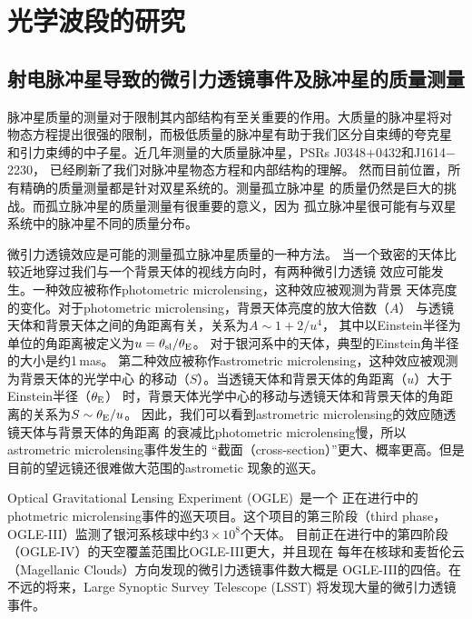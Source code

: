 
\chapter{光学波段的研究}

\section{射电脉冲星导致的微引力透镜事件及脉冲星的质量测量}

脉冲星质量的测量对于限制其内部结构有至关重要的作用。大质量的脉冲星将对
物态方程提出很强的限制，而极低质量的脉冲星有助于我们区分自束缚的夸克星
和引力束缚的中子星。近几年测量的大质量脉冲星，PSRs J0348$+$0432和J1614$-$2230，
已经刷新了我们对脉冲星物态方程和内部结构的理解\supercite{Anton,Demorest,Ozel2010,Lai2011}。
%
然而目前位置，所有精确的质量测量都是针对双星系统的。测量孤立脉冲星
的质量仍然是巨大的挑战。而孤立脉冲星的质量测量有很重要的意义，因为
孤立脉冲星很可能有与双星系统中的脉冲星不同的质量分布。

微引力透镜效应是可能的测量孤立脉冲星质量的一种方法\supercite{Dai,Schwarz02,Horvath96}。
当一个致密的天体比较近地穿过我们与一个背景天体的视线方向时，有两种微引力透镜
效应可能发生。一种效应被称作photometric microlensing，这种效应被观测为背景
天体亮度的变化。对于photometric microlensing，背景天体亮度的放大倍数（$A$）
与透镜天体和背景天体之间的角距离有关，关系为$A\sim 1+2/u^{4}$\supercite{mao}，
其中以Einstein半径为单位的角距离被定义为$u=\theta_{\rm{sl}}/\theta_{\rm{E}}$。
对于银河系中的天体，典型的Einstein角半径的大小是约1\,mas。
%
第二种效应被称作astrometric microlensing，这种效应被观测为背景天体的光学中心
的移动（$S$）。当透镜天体和背景天体的角距离（$u$）大于Einstein半径（$\theta_{\rm{E}}$）
时，背景天体光学中心的移动与透镜天体和背景天体的角距离的关系为$S \sim \theta_{\rm{E}}/u$\supercite{Bel}。
因此，我们可以看到astrometric microlensing的效应随透镜天体与背景天体的角距离
的衰减比photometric microlensing慢，所以astrometric microlensing事件发生的
“截面（cross-section）”更大、概率更高。但是目前的望远镜还很难做大范围的astrometic
现象的巡天。

Optical Gravitational Lensing Experiment (OGLE)~\supercite{Udalski}是一个
正在进行中的photmetric microlensing事件的巡天项目。这个项目的第三阶段（third phase，
OGLE-III）监测了银河系核球中约$3\times10^{8}$个天体\supercite{Szymanski}。
目前正在进行中的第四阶段（OGLE-IV）的天空覆盖范围比OGLE-III更大，并且现在
每年在核球和麦哲伦云（Magellanic Clouds）方向发现的微引力透镜事件数大概是
OGLE-III的四倍。在不远的将来，Large Synoptic Survey Telescope (LSST)\supercite{lsst}
将发现大量的微引力透镜事件。

